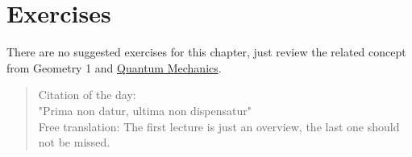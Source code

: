 \documentclass[../main.tex]{subfiles}
\begin{document}
\section{Exercises}
There are no suggested exercises for this chapter, just review the related concept from Geometry 1 and \href{https://www.overleaf.com/read/hczjjtmcwsvj}{Quantum Mechanics}.
\newpage
\vspace*{\fill} 
\begin{quote} 
{\centering 
Citation of the day:\\
"Prima non datur, ultima non dispensatur"}\\
\newline
Free translation: The first lecture is just an overview, the last one should not be missed.
\end{quote}
\vspace*{\fill}
\end{document}

